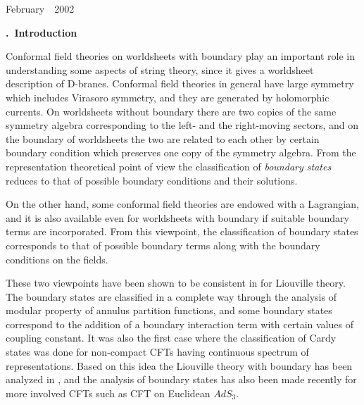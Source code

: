 \documentclass[a4paper,12pt]{article}
\def\section#1{
    \addtocounter{section}{1}\setcounter{subsection}{0}\setcounter{equation}{0}
    \vskip8mm\begin{center}{\bf\thesection~#1}\end{center}}
\begin{document}
\vspace*{\fill}
\noindent February~~2002
\setcounter{page}{0}
\newpage


\setcounter{footnote}{0}
\setcounter{section}{0}
\pagestyle{plain}
\renewcommand{\thesection}{\arabic{section}.}
\renewcommand{\thesubsection}{\arabic{section}.\arabic{subsection}.}
\renewcommand{\theequation}{\arabic{section}.\arabic{equation}}
\renewcommand{\thefootnote}{\arabic{footnote}}
\setcounter{footnote}{0}


\section{Introduction}%

   Conformal field theories on worldsheets with boundary 
 play an important role in understanding some aspects of
 string theory, since it gives a worldsheet description
 of D-branes.
 Conformal field theories in general have large symmetry
 which includes Virasoro symmetry, and they are generated by
 holomorphic currents.
 On worldsheets without boundary there are two copies of the same
 symmetry algebra corresponding to the left- and the right-moving
 sectors, and on the boundary of worldsheets the two are related to
 each other by certain boundary condition which preserves one
 copy of the symmetry algebra.
 From the representation theoretical point of view the classification
 of {\it boundary states} reduces to that of possible boundary
 conditions and their solutions.

   On the other hand, some conformal field theories are endowed
 with a Lagrangian, and it is also available even for worldsheets with
 boundary if suitable boundary terms are incorporated.
 From this viewpoint, the classification of boundary states
 corresponds to that of possible boundary terms along with the
 boundary conditions on the fields.

   These two viewpoints have been shown to be consistent in
 \cite{FZZ,ZZ} for Liouville theory.
 The boundary states are classified in a complete way through
 the analysis of modular property of annulus partition functions,
 and some boundary states correspond to the addition of a
 boundary interaction term with certain values of coupling constant.
 It was also the first case where the classification of Cardy states
 was done for non-compact CFTs having continuous spectrum of
 representations.
 Based on this idea the Liouville theory with boundary has been
 analyzed in \cite{H,PT}, and the analysis of boundary states has
 also been made recently for more involved CFTs such as CFT
 on Euclidean $AdS_3$\cite{GKS,PS,LOP,PST}.
\end{document}
